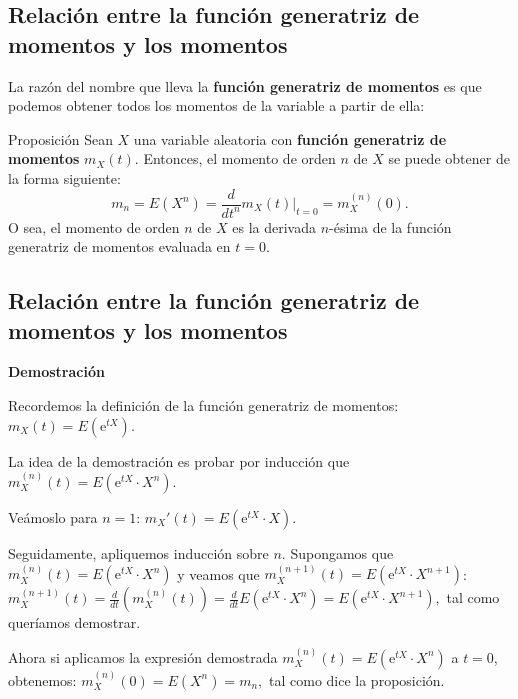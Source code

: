 \documentclass[]{book}
\begin{document}
\hypertarget{relaciuxf3n-entre-la-funciuxf3n-generatriz-de-momentos-y-los-momentos}{%
\subsection{Relación entre la función generatriz de momentos y los momentos}\label{relaciuxf3n-entre-la-funciuxf3n-generatriz-de-momentos-y-los-momentos}}

La razón del nombre que lleva la \textbf{función generatriz de momentos} es que podemos obtener todos los momentos de la variable a partir de ella:

 Proposición
Sean \(X\) una variable aleatoria con \textbf{función generatriz de momentos} \(m_X(t)\). Entonces, el momento de orden \(n\) de \(X\) se puede obtener de la forma siguiente:
\[
m_n =E\left(X^n\right)=\frac{d}{d t^n}m_X(t)|_{t=0} =m_X^{(n)}(0).
\]
O sea, el momento de orden \(n\) de \(X\) es la derivada \(n\)-ésima de la función generatriz de momentos evaluada en \(t=0\).

\hypertarget{relaciuxf3n-entre-la-funciuxf3n-generatriz-de-momentos-y-los-momentos-1}{%
\subsection{Relación entre la función generatriz de momentos y los momentos}\label{relaciuxf3n-entre-la-funciuxf3n-generatriz-de-momentos-y-los-momentos-1}}

\textbf{Demostración}

Recordemos la definición de la función generatriz de momentos: \(m_X(t)=E\left(\mathrm{e}^{tX}\right).\)

La idea de la demostración es probar por inducción que \(m_X^{(n)}(t) =E\left(\mathrm{e}^{tX}\cdot X^n\right)\).

Veámoslo para \(n=1\): \(m_X'(t)=E\left(\mathrm{e}^{tX}\cdot X\right)\).

Seguidamente, apliquemos inducción sobre \(n\). Supongamos que \(m_X^{(n)}(t) =E\left(\mathrm{e}^{tX}\cdot X^n\right)\) y veamos que \(m_X^{(n+1)}(t) =E\left(\mathrm{e}^{tX}\cdot X^{n+1}\right)\):
\(m_X^{(n+1)}(t) =\frac{d}{dt}(m_X^{(n)}(t)) =\frac{d}{dt}E\left(\mathrm{e}^{tX}\cdot X^n\right) = E\left(\mathrm{e}^{tX}\cdot X^{n+1}\right),\)
tal como queríamos demostrar.

Ahora si aplicamos la expresión demostrada \(m_X^{(n)}(t) =E\left(\mathrm{e}^{tX}\cdot X^n\right)\) a \(t=0\), obtenemos:
\(m_X^{(n)}(0) =E\left(X^n\right)=m_n,\)
tal como dice la proposición.
\end{document}
